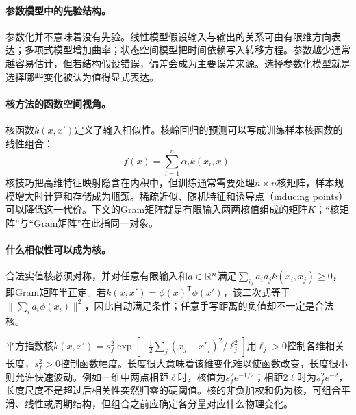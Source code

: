 \paragraph{参数模型中的先验结构。}
参数化并不意味着没有先验。线性模型假设输入与输出的关系可由有限维方向表达；多项式模型增加曲率；状态空间模型把时间依赖写入转移方程。参数越少通常越容易估计，但若结构假设错误，偏差会成为主要误差来源。选择参数化模型就是选择哪些变化被认为值得显式表达。

\paragraph{核方法的函数空间视角。}
核函数$k(x,x')$定义了输入相似性。核岭回归的预测可以写成训练样本核函数的线性组合：
\begin{equation}
 f(x)=\sum_{i=1}^{n}\alpha_i k(x_i,x).
\end{equation}
核技巧把高维特征映射隐含在内积中，但训练通常需要处理$n\times n$核矩阵，样本规模增大时计算和存储成为瓶颈。稀疏近似、随机特征和诱导点（inducing points）可以降低这一代价。下文的Gram矩阵就是有限输入两两核值组成的矩阵$K$；“核矩阵”与“Gram矩阵”在此指同一对象。

\paragraph{什么相似性可以成为核。}
合法实值核必须对称，并对任意有限输入和$a\in\mathbb{R}^n$满足$\sum_{ij}a_ia_jk(x_i,x_j)\geq0$，即Gram矩阵半正定。若$k(x,x')=\phi(x)^{\mathsf T}\phi(x')$，该二次式等于$\|\sum_ia_i\phi(x_i)\|^2$，因此自动满足条件；任意手写距离的负值却不一定是合法核。

平方指数核$k(x,x')=s_f^2\exp[-\frac12\sum_j(x_j-x'_j)^2/\ell_j^2]$用$\ell_j>0$控制各维相关长度，$s_f^2>0$控制函数幅度。长度很大意味着该维变化难以使函数改变，长度很小则允许快速波动。例如一维中两点相距$\ell$时，核值为$s_f^2e^{-1/2}$；相距$2\ell$时为$s_f^2e^{-2}$，长度尺度不是超过后相关性突然归零的硬阈值。核的非负加权和仍为核，可组合平滑、线性或周期结构，但组合之前应确定各分量对应什么物理变化。

